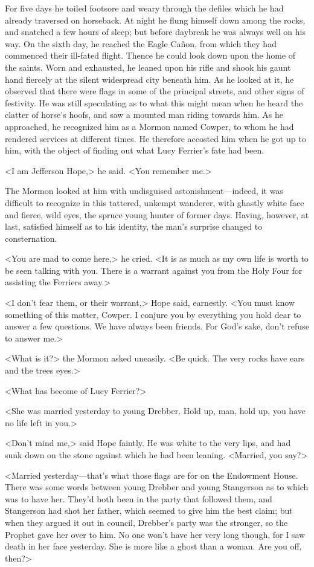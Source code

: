 For five days he toiled footsore and weary through the defiles which he had already traversed on horseback. At night he flung himself down among the rocks, and snatched a few hours of sleep; but before daybreak he was always well on his way. On the sixth day, he reached the Eagle Cañon, from which they had commenced their ill-fated flight. Thence he could look down upon the home of the saints. Worn and exhausted, he leaned upon his rifle and shook his gaunt hand fiercely at the silent widespread city beneath him. As he looked at it, he observed that there were flags in some of the principal streets, and other signs of festivity. He was still speculating as to what this might mean when he heard the clatter of horse's hoofs, and saw a mounted man riding towards him. As he approached, he recognized him as a Mormon named Cowper, to whom he had rendered services at different times. He therefore accosted him when he got up to him, with the object of finding out what Lucy Ferrier's fate had been.

<I am Jefferson Hope,> he said. <You remember me.>

The Mormon looked at him with undisguised astonishment—indeed, it was difficult to recognize in this tattered, unkempt wanderer, with ghastly white face and fierce, wild eyes, the spruce young hunter of former days. Having, however, at last, satisfied himself as to his identity, the man's surprise changed to consternation.

<You are mad to come here,> he cried. <It is as much as my own life is worth to be seen talking with you. There is a warrant against you from the Holy Four for assisting the Ferriers away.>

<I don't fear them, or their warrant,> Hope said, earnestly. <You must know something of this matter, Cowper. I conjure you by everything you hold dear to answer a few questions. We have always been friends. For God's sake, don't refuse to answer me.>

<What is it?> the Mormon asked uneasily. <Be quick. The very rocks have ears and the trees eyes.>

<What has become of Lucy Ferrier?>

<She was married yesterday to young Drebber. Hold up, man, hold up, you have no life left in you.>

<Don't mind me,> said Hope faintly. He was white to the very lips, and had sunk down on the stone against which he had been leaning. <Married, you say?>

<Married yesterday—that's what those flags are for on the Endowment House. There was some words between young Drebber and young Stangerson as to which was to have her. They'd both been in the party that followed them, and Stangerson had shot her father, which seemed to give him the best claim; but when they argued it out in council, Drebber's party was the stronger, so the Prophet gave her over to him. No one won't have her very long though, for I saw death in her face yesterday. She is more like a ghost than a woman. Are you off, then?>

